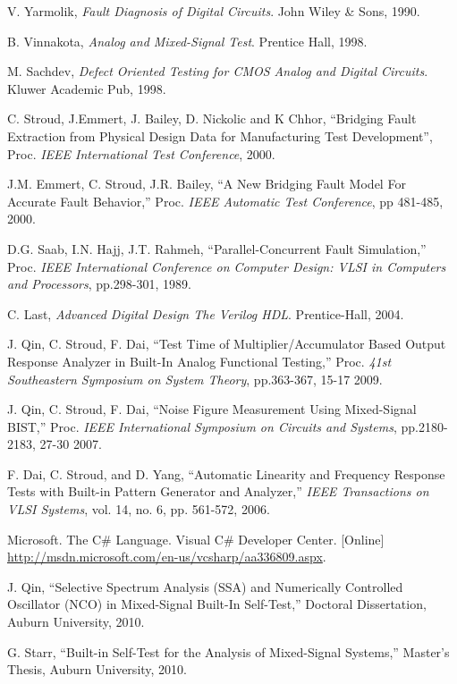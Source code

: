\documentclass[12pt]{report}
\begin{document}
\begin{thebibliography}{99}
 V. Yarmolik, \textit{Fault Diagnosis of Digital Circuits}. John Wiley & Sons, 1990.

 B. Vinnakota, \textit{Analog and Mixed-Signal Test}. Prentice Hall, 1998.

 M. Sachdev, \textit{Defect Oriented Testing for CMOS Analog and Digital Circuits}.  Kluwer Academic Pub, 1998.

 C. Stroud, J.Emmert, J. Bailey, D. Nickolic and K Chhor, ``Bridging Fault Extraction from Physical Design Data for Manufacturing Test Development'', Proc. \textit{IEEE International Test Conference}, 2000.

 J.M. Emmert, C. Stroud, J.R. Bailey, ``A New Bridging Fault Model For Accurate Fault Behavior,'' Proc. \textit{IEEE Automatic Test Conference}, pp 481-485, 2000.

 D.G. Saab, I.N. Hajj, J.T. Rahmeh, ``Parallel-Concurrent Fault Simulation,'' Proc. \textit{IEEE International Conference on Computer Design: VLSI in Computers and Processors}, pp.298-301, 1989.

 C. Last, \textit{Advanced Digital Design The Verilog HDL}.  Prentice-Hall, 2004.

 J. Qin, C. Stroud, F. Dai, ``Test Time of Multiplier/Accumulator Based Output Response Analyzer in Built-In Analog Functional Testing,'' Proc. \textit{41st Southeastern Symposium on System Theory}, pp.363-367, 15-17 2009.

 J. Qin, C. Stroud, F. Dai, ``Noise Figure Measurement Using Mixed-Signal BIST,'' Proc. \textit{IEEE International Symposium on Circuits and Systems}, pp.2180-2183, 27-30 2007.

 F. Dai, C. Stroud, and D. Yang, ``Automatic Linearity and Frequency Response Tests with Built-in Pattern Generator and Analyzer,''  \textit{IEEE Transactions on VLSI Systems}, vol. 14, no. 6, pp. 561-572, 2006.

 Microsoft. The C\# Language. Visual C\# Developer Center. [Online] \url{http://msdn.microsoft.com/en-us/vcsharp/aa336809.aspx}.

 J. Qin, ``Selective Spectrum Analysis (SSA) and Numerically Controlled Oscillator (NCO) in Mixed-Signal Built-In Self-Test,'' Doctoral Dissertation, Auburn University, 2010.

 G. Starr, ``Built-in Self-Test for the Analysis of Mixed-Signal Systems,'' Master's Thesis, Auburn University, 2010.


\end{thebibliography}
\end{document}

